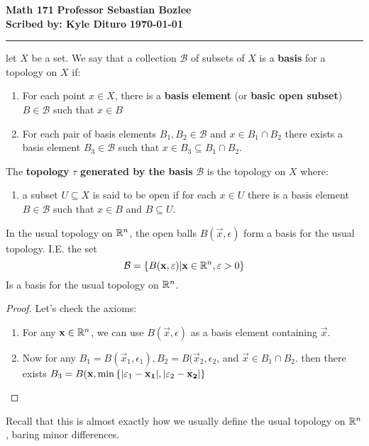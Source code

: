 \documentclass[12pt, twosided]{article}
\begin{document}
\noindent \textbf{Math 171} \hfill \textbf{Professor Sebastian Bozlee} \\
\textbf{Scribed by: Kyle Dituro} \hfill \textbf{\today}\hrule
\vspace{.2in}

\begin{df}
  let \(X\) be a set. We say that a collection \(\mathcal{B}\) of subsets of \(X\) is a \textbf{basis} for a topology on \(X\) if:
  \begin{enumerate}
  \item For each point \(x\in X\), there is a \textbf{basis element} (or \textbf{basic open subset}) \(B \in \mathcal{B}\) such that \(x \in B\)
  \item For each pair of basis elements \(B_1, B_2 \in \mathcal{B}\) and \(x \in B_1 \cap B_2\) there exists a basis element \(B_3 \in \mathcal{B}\) such that \(x \in B_3 \subseteq B_1 \cap B_2\).
  \end{enumerate}

  The \textbf{topology} \(\tau\) \textbf{generated by the basis} \(\mathcal{B}\) is the topology on \(X\) where:
  \begin{enumerate}
  \item a subset \(U \subseteq X\) is said to be open if for each \(x \in U\) there is a basis element \(B \in \mathcal{B}\) such that \(x \in B\) and \(B \subseteq U\).
  \end{enumerate}
\end{df}

\begin{exa}
  In the usual topology on \(\mathbb{R}^n\), the open balls \(B(\vec{x}, \epsilon)\) form a basis for the usual topology. I.E. the set
  \[\mathcal{B} = \left\{ B(\mathbf{x}, \varepsilon) \middle\vert \mathbf{x} \in \mathbb{R}^n, \varepsilon > 0 \right\}\] Is a basis for the usual topology on \(\mathbb{R}^n\).

  \begin{proof}
    Let's check the axioms:

    \begin{enumerate}
    \item For any \(\mathbf{x} \in \mathbb{R}^n\), we can use \(B(\vec{x}, \epsilon)\) as a basis element containing \(\vec{x}\).
    \item Now for any \(B_1 = B(\vec{x}_1, \epsilon_1), B_2 = B(\vec{x}_2, \epsilon_2\), and \(\vec{x} \in B_1 \cap B_2\). then there exists \(B_3 = B(\mathbf{x}, \min \left\{ |\varepsilon_1 - \mathbf{x_1}|, |\varepsilon_2 - \mathbf{x_2}| \right\}\)
    \end{enumerate}
  \end{proof}

  Recall that this is almost exactly how we usually define the usual topology on \(\mathbb{R}^n\), baring minor differences.
\end{exa}
\end{document}
